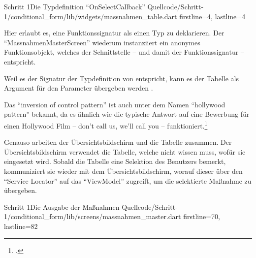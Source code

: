   \begin{alexlisting}{Schritt 1}{Die Typdefinition \enquote{OnSelectCallback}}
    {Quellcode/Schritt-1/conditional_form/lib/widgets/massnahmen_table.dart}
    {firstline=4, lastline=4}
    \label{lst:Schritt1TypedefOnSelectCallback}
  \end{alexlisting}
  
  Hier erlaubt es, eine Funktionssignatur als einen Typ zu deklarieren.
  Der \enquote{MassnahmenMasterScreen} wiederum instanziiert ein anonymes Funktionsobjekt,
  welches der Schnittstelle -- und damit der Funktionssignatur -- entspricht.



  Weil es der Signatur der Typdefinition von  entspricht,
  kann es der Tabelle als Argument für den Parameter  übergeben werden . 
  

  



Das \enquote{inversion of control pattern} ist auch unter dem Namen \enquote{hollywood pattern} bekannt,
da es ähnlich wie die typische Antwort auf eine Bewerbung für einen Hollywood Film
-- don’t call us, we’ll call you --
funktioniert.\footcite[Vgl.][]{fowler2005InversionOfControl}

Genauso arbeiten der Übersichtsbildschirm und die Tabelle zusammen.
Der Übersichtsbildschirm verwendet die Tabelle, welche nicht wissen muss, wofür sie eingesetzt wird.
Sobald die Tabelle eine Selektion des Benutzers bemerkt, kommuniziert sie wieder mit dem Übersichtsbildschirm, worauf dieser über den \enquote{Service Locator} auf das \enquote{ViewModel} zugreift, um die selektierte Maßnahme zu übergeben.

\clearpage


\begin{alexlisting}{Schritt 1}{Die Ausgabe der Maßnahmen}
    {Quellcode/Schritt-1/conditional_form/lib/screens/massnahmen_master.dart}
    {firstline=70, lastline=82}
    \label{lst:Schritt1MassnahmenTableOnSelect}
  \end{alexlisting}

\vspace{21mm}

